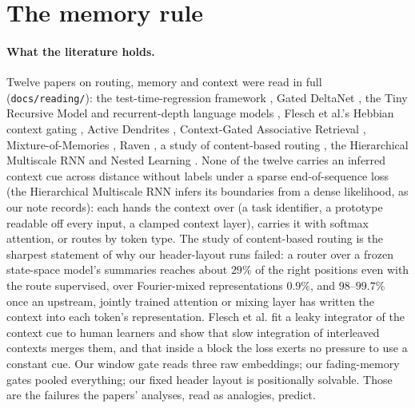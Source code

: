 \documentclass[11pt]{article}
\begin{document}
\section{The memory rule}
\label{sec:memory}

\paragraph{What the literature holds.} Twelve papers on routing, memory and context were read in full (\texttt{docs/reading/}): the test-time-regression framework \cite{ttr}, Gated DeltaNet \cite{gdn}, the Tiny Recursive Model and recurrent-depth language models \cite{trm, recdepth}, Flesch et al.'s Hebbian context gating \cite{flesch}, Active Dendrites \cite{dendrites}, Context-Gated Associative Retrieval \cite{cgar}, Mixture-of-Memories \cite{mom}, Raven \cite{raven}, a study of content-based routing \cite{routing}, the Hierarchical Multiscale RNN \cite{hmrnn} and Nested Learning \cite{nested}. None of the twelve carries an inferred context cue across distance without labels under a sparse end-of-sequence loss (the Hierarchical Multiscale RNN infers its boundaries from a dense likelihood, as our note records): each hands the context over (a task identifier, a prototype readable off every input, a clamped context layer), carries it with softmax attention, or routes by token type. The study of content-based routing is the sharpest statement of why our header-layout runs failed: a router over a frozen state-space model's summaries reaches about $29\%$ of the right positions even with the route supervised, over Fourier-mixed representations $0.9\%$, and $98$--$99.7\%$ once an upstream, jointly trained attention or mixing layer has written the context into each token's representation. Flesch et al. fit a leaky integrator of the context cue to human learners and show that slow integration of interleaved contexts merges them, and that inside a block the loss exerts no pressure to use a constant cue. Our window gate reads three raw embeddings; our fading-memory gates pooled everything; our fixed header layout is positionally solvable. Those are the failures the papers' analyses, read as analogies, predict.
\end{document}
